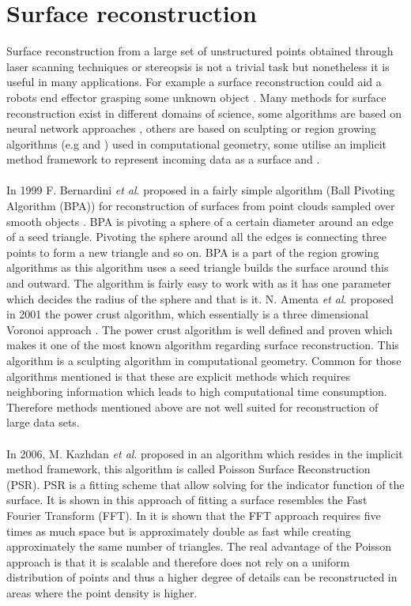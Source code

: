 \section{Surface reconstruction}
Surface reconstruction from a large set of unstructured points obtained through laser scanning techniques or stereopsis is not a trivial task but nonetheless it is useful in many applications. For example a surface reconstruction could aid a robots end effector grasping some unknown object \cite{Wang2005}. Many methods for surface reconstruction exist in different domains of science, some algorithms are based on neural network approaches  \cite{Wu2007}, others are based on sculpting or region growing algorithms (e.g \cite{Bernardini1999} and \cite{Amenta2001}) used in computational geometry, some utilise an implicit method framework to represent incoming data as a surface \cite{Kazhdan2006} and \cite{Dong2011}.\\
\\
In 1999 F. Bernardini \textit{et al}. proposed in a fairly simple algorithm (Ball Pivoting Algorithm (BPA)) for reconstruction of surfaces from point clouds sampled over smooth objects \cite{Bernardini1999}. BPA is pivoting a sphere of a certain diameter around an edge of a seed triangle. Pivoting the sphere around all the edges is connecting three points to form a new triangle and so on. BPA is a part of the region growing algorithms as this algorithm uses a seed triangle builds the surface around this and outward. The algorithm is fairly easy to work with as it has one parameter which decides the radius of the sphere and that is it. N. Amenta \textit{et al}. proposed in 2001 \cite{Amenta2001} the power crust algorithm, which essentially is a three dimensional Voronoi approach \cite{Ledoux2007}. The power crust algorithm is well defined and proven which makes it one of the most known algorithm regarding surface reconstruction. This algorithm is a sculpting algorithm in computational geometry. Common for those algorithms mentioned is that these are explicit methods which requires neighboring information which leads to high computational time consumption. Therefore methods mentioned above are not well suited for reconstruction of large data sets.\\
\\
In 2006, M. Kazhdan \textit{et al}. proposed in \cite{Kazhdan2006} an algorithm which resides in the implicit method framework, this algorithm is called Poisson Surface Reconstruction (PSR). PSR is a fitting scheme that allow solving for the indicator function of the surface. It is shown in \cite{Kazhdan2006} this approach of fitting a surface resembles the Fast Fourier Transform (FFT). In \cite{Kazhdan2006} it is shown that the FFT approach requires five times as much space but is approximately double as fast while creating approximately the same number of triangles. The real advantage of the Poisson approach is that it is scalable and therefore does not rely on a uniform distribution of points and thus a higher degree of details can be reconstructed in areas where the point density is higher.\\
